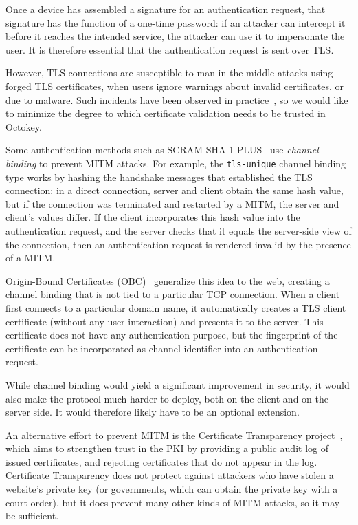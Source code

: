 Once a device has assembled a signature for an authentication request, that signature has the
function of a one-time password: if an attacker can intercept it before it reaches the intended
service, the attacker can use it to impersonate the user. It is therefore essential that the
authentication request is sent over TLS.

However, TLS connections are susceptible to man-in-the-middle attacks using forged TLS certificates,
when users ignore warnings about invalid certificates, or due to malware. Such incidents have been
observed in practice~\cite{Huang14, Adkins11}, so we would like to minimize the degree to which
certificate validation needs to be trusted in Octokey.

Some authentication methods such as SCRAM-SHA-1-PLUS~\cite{SCRAM} use \emph{channel binding} to
prevent MITM attacks. For example, the \texttt{tls-unique} channel binding type works by hashing the
handshake messages that established the TLS connection: in a direct connection, server and client
obtain the same hash value, but if the connection was terminated and restarted by a MITM, the server
and client's values differ. If the client incorporates this hash value into the authentication
request, and the server checks that it equals the server-side view of the connection, then an
authentication request is rendered invalid by the presence of a MITM.

Origin-Bound Certificates (OBC)~\cite{Dietz12} generalize this idea to the web, creating a channel
binding that is not tied to a particular TCP connection. When a client first connects to a
particular domain name, it automatically creates a TLS client certificate (without any user
interaction) and presents it to the server. This certificate does not have any authentication
purpose, but the fingerprint of the certificate can be incorporated as channel identifier into an
authentication request.

While channel binding would yield a significant improvement in security, it would also make the
protocol much harder to deploy, both on the client and on the server side. It would therefore likely
have to be an optional extension.

An alternative effort to prevent MITM is the Certificate Transparency project~\cite{CertTrans},
which aims to strengthen trust in the PKI by providing a public audit log of issued certificates,
and rejecting certificates that do not appear in the log. Certificate Transparency does not protect
against attackers who have stolen a website's private key (or governments, which can obtain the
private key with a court order), but it does prevent many other kinds of MITM attacks, so it may be
sufficient.
